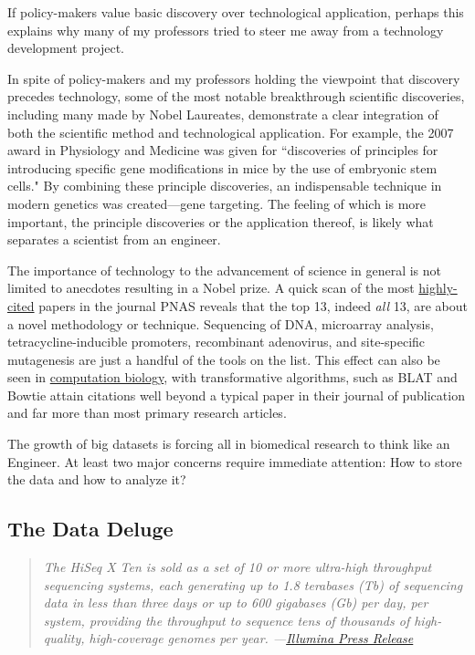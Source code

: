     If policy-makers value basic discovery over technological application, perhaps this explains why many of my professors tried to steer me away from a technology development project.

    In spite of policy-makers and my professors holding the viewpoint that discovery precedes technology, some of the most notable breakthrough scientific discoveries, including many made by Nobel Laureates, demonstrate a clear integration of both the scientific method and technological application. For example, the 2007 award in Physiology and Medicine was given for ``discoveries of principles for introducing specific gene modifications in mice by the use of embryonic stem cells."  By combining these principle discoveries, an indispensable technique in modern genetics was created---gene targeting. The feeling of which is more important, the principle discoveries or the application thereof, is likely what separates a scientist from an engineer.

    The importance of technology to the advancement of science in general is not limited to anecdotes resulting in a Nobel prize. A quick scan of the most \href{http://www.pnas.org/reports/most-cited}{highly-cited} papers in the journal PNAS reveals that the top 13, indeed \textit{all} 13, are about a novel methodology or technique. Sequencing of DNA, microarray analysis, tetracycline-inducible promoters, recombinant adenovirus, and site-specific mutagenesis are just a handful of the tools on the list. This effect can also be seen in \href{http://simplystatistics.org/2014/04/07/writing-good-software-can-have-more-impact-than-publishing-in-high-impact-journals-for-genomic-statisticians/}{computation biology}, with transformative algorithms, such as BLAT \citep{Altschul1990} and Bowtie \citep{Langmead2009} attain citations well beyond a typical paper in their journal of publication and far more than most primary research articles.    

    The growth of big datasets is forcing all in biomedical research to think like an Engineer. At least two major concerns require immediate attention: How to store the data and how to analyze it?

  \subsection{The Data Deluge}
    \label{Disc:subsec:Dealing with Data Deluge}

    \begin{quote}
      \itshape
      \singlespacing
      The HiSeq X Ten is sold as a set of 10 or more ultra-high throughput sequencing systems, each generating up to 1.8 terabases (Tb) of sequencing data in less than three days or up to 600 gigabases (Gb) per day, per system, providing the throughput to sequence tens of thousands of high-quality, high-coverage genomes per year. ---\href{http://bit.ly/PZpegZ}{Illumina Press Release}
      \end{quote}


